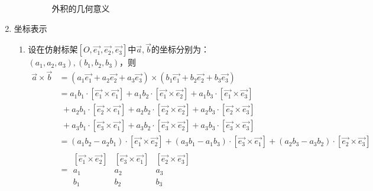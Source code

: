 \begin{enumerate}[1.]
\begin{enumerate}[]
\begin{figure}[htb]
\begin{minipage}{0.4\linewidth}
				\caption{外积的几何意义}
				\label{外积}
			\end{minipage}
		\end{figure}
	\end{enumerate}
	\newpage
	\item {\color{dy2}坐标表示}
	\begin{enumerate}[]
				\setlength{\itemindent}{1.5em} 
		\setlength{\topsep}{0.01em}
		\setlength{\itemsep}{0.01em}
		\item 设在仿射标架$[O,\overrightarrow{e_1},\overrightarrow{e_2},\overrightarrow{e_3}]$中$\overrightarrow{a},\overrightarrow{b}$的坐标分别为：$(a_1,a_2,a_3),(b_1,b_2,b_3)$，则
		\begin{equation}
			\begin{aligned}
				\overrightarrow{a} \times \overrightarrow{b}&=(a_1\overrightarrow{e_1}+a_2\overrightarrow{e_2}+a_3\overrightarrow{e_3})\times (b_1\overrightarrow{e_1}+b_2\overrightarrow{e_2}+b_3\overrightarrow{e_3})\\
				&=a_1b_1\cdot  \left[\overrightarrow{e_1}\times \overrightarrow{e_1}\right]+a_1b_2\cdot  \left[\overrightarrow{e_1}\times \overrightarrow{e_2}\right]+a_1b_3\cdot  \left[\overrightarrow{e_1}\times\overrightarrow{e_3}\right]\\
				&\,\, +a_2b_1\cdot  \left[\overrightarrow{e_2}\times \overrightarrow{e_1}\right]+a_2b_2\cdot  \left[\overrightarrow{e_2}\times \overrightarrow{e_2}\right]+a_2b_3\cdot  \left[\overrightarrow{e_2}\times\overrightarrow{e_3}\right]\\
				&\,\,  +a_3b_1\cdot  \left[\overrightarrow{e_3}\times \overrightarrow{e_1}\right]+a_3b_2\cdot  \left[\overrightarrow{e_3}\times \overrightarrow{e_2}\right]+a_3b_3\cdot  \left[\overrightarrow{e_3}\times \overrightarrow{e_3}\right]\\
				&=\left( a_1b_2-a_2b_1\right)\cdot \left[\overrightarrow{e_1}\times \overrightarrow{e_2}\right]+\left(a_3b_1-a_1b_3\right)\cdot \left[\overrightarrow{e_3}\times \overrightarrow{e_1}\right]+\left(a_2b_3-a_3b_2\right)\cdot \left[\overrightarrow{e_2}\times \overrightarrow{e_3}\right] \\
				&=\begin{array}{|ccc|}
					\left[\overrightarrow{e_1}\times \overrightarrow{e_2}\right]&\left[\overrightarrow{e_3}\times \overrightarrow{e_1}\right]  &\left[\overrightarrow{e_2}\times \overrightarrow{e_3}\right]  \\
					a_1 & a_2 & a_3 \\
					b_1 & b_2 & b_3
				\end{array}

\end{aligned}
\end{equation}
\end{enumerate}
\end{enumerate}
